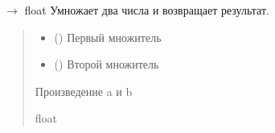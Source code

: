 \documentclass[letterpaper,10pt,russian]{sphinxmanual}
\begin{document}
\begin{fulllineitems}
\label{\detokenize{Calculator:Calculator.multiply}}
\pysigstartsignatures
\pysiglinewithargsret
{}
{\sphinxparamcomma {}}
{{ $\rightarrow$ float}}
\pysigstopsignatures
\sphinxAtStartPar
Умножает два числа и возвращает результат.
\begin{quote}\begin{description}
\begin{itemize}
\item {} 
\sphinxAtStartPar
{} () \textendash{} Первый множитель

\item {} 
\sphinxAtStartPar
{} () \textendash{} Второй множитель

\end{itemize}

\sphinxAtStartPar
Произведение a и b

\sphinxAtStartPar
float

\end{description}\end{quote}
\begin{description}
\begin{sphinxVerbatim}[commandchars=\\\{\}]
 
\end{sphinxVerbatim}

\end{description}

\end{fulllineitems}

\end{document}
